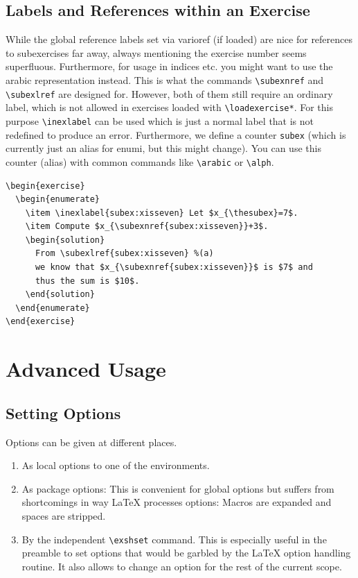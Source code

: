 \documentclass[DIV12,BCOR0mm]{scrartcl}
\begin{document}
\subsection{Labels and References within an Exercise}
While the global reference labels set via varioref (if loaded)
are nice for references to subexercises far away, always mentioning
the exercise number seems superfluous. Furthermore, for usage in indices etc. you might want to use the arabic representation instead. This is what the commands \lstinline|\subexnref| and
\lstinline|\subexlref| are designed for. However, both of them still
require an ordinary label, which is not allowed in
exercises loaded with \lstinline|\loadexercise*|.
For this purpose \lstinline|\inexlabel| can be used which is just a
normal label that is not redefined to produce an error.
Furthermore, we define a counter \lstinline|subex| (which is
currently just an alias for enumi, but this might change). You can
use this counter (alias) with common commands like
\lstinline|\arabic| or \lstinline|\alph|.

\begin{lstlisting}
\begin{exercise}
  \begin{enumerate}
    \item \inexlabel{subex:xisseven} Let $x_{\thesubex}=7$.
    \item Compute $x_{\subexnref{subex:xisseven}}+3$.
    \begin{solution}
      From \subexlref{subex:xisseven} %(a)
      we know that $x_{\subexnref{subex:xisseven}}$ is $7$ and
      thus the sum is $10$.
    \end{solution}
  \end{enumerate}
\end{exercise}
\end{lstlisting}



\section{Advanced Usage}

\subsection{Setting Options}

Options can be given at different places.
\begin{enumerate}
 \item As local options to one of the environments.
 \item As package options: This is convenient for global options but suffers
  from shortcomings in way \LaTeX{} processes options: Macros are expanded and
  spaces are stripped.
 \item By the independent \lstinline|\exshset| command. This is especially useful in
  the preamble to set options that would be garbled by the \LaTeX{} option
  handling routine. It also allows to change an option for the rest of the
  current scope.
\end{enumerate}
\end{document}
